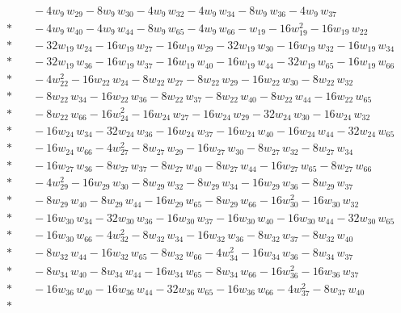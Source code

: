 \begin{align*}
&\quad  - 4w_{9}\,w_{29} - 8w_{9}\,w_{30} - 4w_{9}\,w_{32} - 4w_{9}\,w_{34} - 8w_{9}\,w_{36} - 4w_{9}\,w_{37} \\*
&\quad  - 4w_{9}\,w_{40} - 4w_{9}\,w_{44} - 8w_{9}\,w_{65} - 4w_{9}\,w_{66} - w_{19} - 16w_{19}^{2} - 16w_{19}\,w_{22} \\*
&\quad  - 32w_{19}\,w_{24} - 16w_{19}\,w_{27} - 16w_{19}\,w_{29} - 32w_{19}\,w_{30} - 16w_{19}\,w_{32} - 16w_{19}\,w_{34} \\*
&\quad  - 32w_{19}\,w_{36} - 16w_{19}\,w_{37} - 16w_{19}\,w_{40} - 16w_{19}\,w_{44} - 32w_{19}\,w_{65} - 16w_{19}\,w_{66} \\*
&\quad  - 4w_{22}^{2} - 16w_{22}\,w_{24} - 8w_{22}\,w_{27} - 8w_{22}\,w_{29} - 16w_{22}\,w_{30} - 8w_{22}\,w_{32} \\*
&\quad  - 8w_{22}\,w_{34} - 16w_{22}\,w_{36} - 8w_{22}\,w_{37} - 8w_{22}\,w_{40} - 8w_{22}\,w_{44} - 16w_{22}\,w_{65} \\*
&\quad  - 8w_{22}\,w_{66} - 16w_{24}^{2} - 16w_{24}\,w_{27} - 16w_{24}\,w_{29} - 32w_{24}\,w_{30} - 16w_{24}\,w_{32} \\*
&\quad  - 16w_{24}\,w_{34} - 32w_{24}\,w_{36} - 16w_{24}\,w_{37} - 16w_{24}\,w_{40} - 16w_{24}\,w_{44} - 32w_{24}\,w_{65} \\*
&\quad  - 16w_{24}\,w_{66} - 4w_{27}^{2} - 8w_{27}\,w_{29} - 16w_{27}\,w_{30} - 8w_{27}\,w_{32} - 8w_{27}\,w_{34} \\*
&\quad  - 16w_{27}\,w_{36} - 8w_{27}\,w_{37} - 8w_{27}\,w_{40} - 8w_{27}\,w_{44} - 16w_{27}\,w_{65} - 8w_{27}\,w_{66} \\*
&\quad  - 4w_{29}^{2} - 16w_{29}\,w_{30} - 8w_{29}\,w_{32} - 8w_{29}\,w_{34} - 16w_{29}\,w_{36} - 8w_{29}\,w_{37} \\*
&\quad  - 8w_{29}\,w_{40} - 8w_{29}\,w_{44} - 16w_{29}\,w_{65} - 8w_{29}\,w_{66} - 16w_{30}^{2} - 16w_{30}\,w_{32} \\*
&\quad  - 16w_{30}\,w_{34} - 32w_{30}\,w_{36} - 16w_{30}\,w_{37} - 16w_{30}\,w_{40} - 16w_{30}\,w_{44} - 32w_{30}\,w_{65} \\*
&\quad  - 16w_{30}\,w_{66} - 4w_{32}^{2} - 8w_{32}\,w_{34} - 16w_{32}\,w_{36} - 8w_{32}\,w_{37} - 8w_{32}\,w_{40} \\*
&\quad  - 8w_{32}\,w_{44} - 16w_{32}\,w_{65} - 8w_{32}\,w_{66} - 4w_{34}^{2} - 16w_{34}\,w_{36} - 8w_{34}\,w_{37} \\*
&\quad  - 8w_{34}\,w_{40} - 8w_{34}\,w_{44} - 16w_{34}\,w_{65} - 8w_{34}\,w_{66} - 16w_{36}^{2} - 16w_{36}\,w_{37} \\*
&\quad  - 16w_{36}\,w_{40} - 16w_{36}\,w_{44} - 32w_{36}\,w_{65} - 16w_{36}\,w_{66} - 4w_{37}^{2} - 8w_{37}\,w_{40} \\*

\end{align*}
